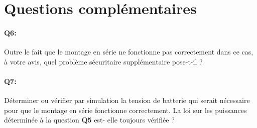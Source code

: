 \documentclass{article}
\begin{document}
\section{Questions complémentaires}
\paragraph{Q6:} Outre le fait que le montage en série ne fonctionne pas correctement dans ce cas, à votre avis, quel problème sécuritaire supplémentaire pose-t-il ?
\paragraph{Q7:} Déterminer ou vérifier par simulation la tension de batterie qui serait nécessaire pour que le montage en série fonctionne correctement. 
La loi sur les puissances déterminée à la question \textbf{Q5} est- elle toujours vérifiée ?
\end{document}
